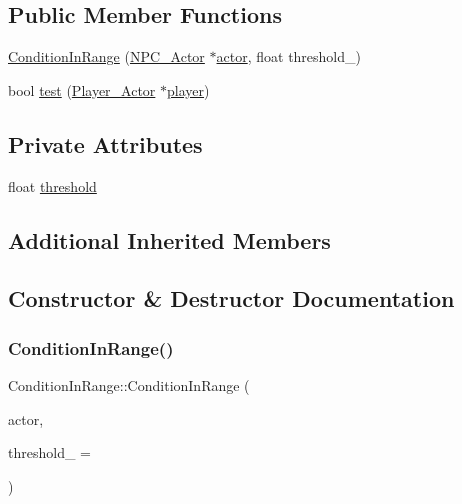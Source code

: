 \subsection*{Public Member Functions}
\begin{DoxyCompactItemize}
\item 
\hyperlink{classConditionInRange_ab66b0941b8bb7304f3f4b5eb758d30cc}{Condition\+In\+Range} (\hyperlink{classNPC__Actor}{N\+P\+C\+\_\+\+Actor} $\ast$\hyperlink{classCondition_a95c8585457c094a8564ac5111e66620d}{actor}, float threshold\+\_)
\item 
bool \hyperlink{classConditionInRange_a64cc1a7816537a2d8e29972199b3e8f9}{test} (\hyperlink{classPlayer__Actor}{Player\+\_\+\+Actor} $\ast$\hyperlink{game__play__state_8cpp_ac65a4bc85dcd7c1cefbc84425f42fc46}{player})
\end{DoxyCompactItemize}
\subsection*{Private Attributes}
\begin{DoxyCompactItemize}
\item 
float \hyperlink{classConditionInRange_a5c54f7654bd6702a93b5166ef657f580}{threshold}
\end{DoxyCompactItemize}
\subsection*{Additional Inherited Members}


\subsection{Constructor \& Destructor Documentation}
\mbox{\label{classConditionInRange_ab66b0941b8bb7304f3f4b5eb758d30cc}} 
\subsubsection{\texorpdfstring{Condition\+In\+Range()}{ConditionInRange()}}
{\footnotesize\ttfamily Condition\+In\+Range\+::\+Condition\+In\+Range (\begin{DoxyParamCaption}\item[{\hyperlink{classNPC__Actor}{N\+P\+C\+\_\+\+Actor} $\ast$}]{actor,  }\item[{float}]{threshold\+\_\+ = {} }\end{DoxyParamCaption})\hspace{0.3cm}{\ttfamily [inline]}}



